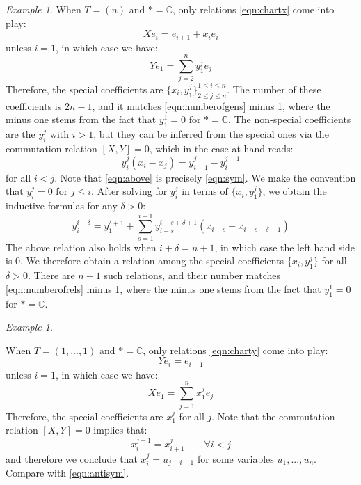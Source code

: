 \documentclass[12pt]{amsart}
\numberwithin{equation}{section}
\newtheorem{proposition}[theorem]{Proposition}
\theoremstyle{definition}
\theoremstyle{remark}
\newtheorem{example}[theorem]{Example}
\newcommand{\CC}{\mathbb{C}}
\renewcommand{\1}{\mathbf{1}}
\begin{document}
\begin{example}
\label{ex:symmetric}
When $T= (n)$ and $* = \CC$, only relations \eqref{eqn:chartx} come into play:
$$
Xe_i = e_{i+1} + x_i e_i
$$
unless $i=1$, in which case we have:
$$
Y e_1 = \sum_{j=2}^n y_1^j e_j
$$
Therefore, the special coefficients are $\{x_i, y_1^j\}^{1\leq i \leq n}_{2\leq j \leq n}$. The number of these coefficients is $2n-1$, and it matches \eqref{eqn:numberofgens} minus 1, where the minus one stems from the fact that $y_1^1 = 0$ for $* = \CC$. The non-special coefficients are the $y_i^j$ with $i>1$, but they can be inferred from the special ones via the commutation relation $[X,Y]=0$, which in the case at hand reads:
\begin{equation}
\label{eqn:above}
y^j_i (x_i-x_j) = y^j_{i+1} - y^{j-1}_i
\end{equation}
for all $i<j$. Note that \eqref{eqn:above} is precisely \eqref{eqn:sym}.  We make the convention that $y_i^j=0$ for $j\leq i$. After solving for $y^j_i$ in terms of $\{x_i, y_1^j\}$, we obtain the inductive formulas for any $\delta>0$:
$$
y_i^{i+\delta} = y_1^{\delta+1} + \sum_{s=1}^{i-1} y_{i-s}^{i-s+\delta+1} (x_{i-s}-x_{i-s+\delta+1})
$$
The above relation also holds when $i+\delta=n+1$, in which case the left hand side is 0. We therefore obtain a relation among the special coefficients $\{x_i,y_1^j\}$ for all $\delta>0$. There are $n-1$ such relations, and their number matches \eqref{eqn:numberofrels} minus 1, where the minus one stems from the fact that $y_1^1 = 0$ for $* = \CC$.

\end{example}


\begin{example}
\label{ex:antisymmetric}

When $T= (1,...,1)$ and $* = \CC$, only relations \eqref{eqn:charty} come into play:
$$
Ye_i = e_{i+1}
$$
unless $i=1$, in which case we have:
$$
X e_1 = \sum_{j=1}^n x_1^j e_j
$$
Therefore, the special coefficients are $x_1^j$ for all $j$. Note that the commutation relation $[X,Y]=0$ implies that:
$$
x_i^{j-1} = x_{i+1}^j \qquad \forall i<j
$$
and therefore we conclude that $x_i^j = u_{j-i+1}$ for some variables $u_1,...,u_n$. Compare with \eqref{eqn:antisym}. 

\end{example}

\end{document}

